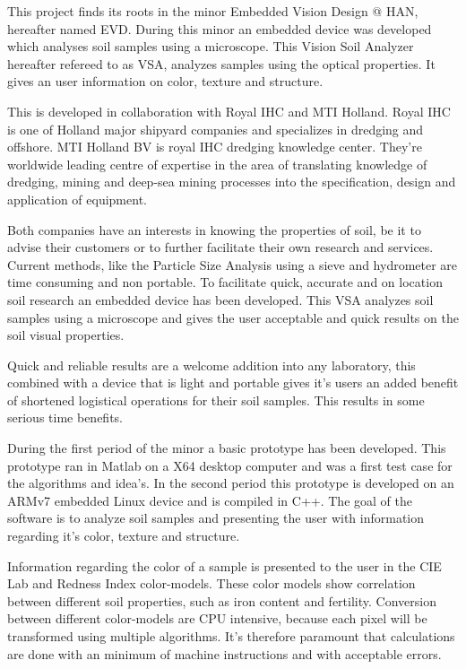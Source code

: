 This project finds its roots in the minor Embedded Vision Design @ HAN, hereafter named EVD. During this minor an embedded device was developed which analyses soil samples using a microscope. This Vision Soil Analyzer hereafter refereed to as VSA, analyzes samples using the optical properties. It gives an user information on color, texture and structure.

This is developed in collaboration with Royal IHC and MTI Holland. Royal IHC is one of Holland major shipyard companies and specializes in dredging and offshore. MTI Holland BV is royal IHC dredging knowledge center. They're worldwide leading centre of expertise in the area of translating knowledge of dredging, mining and deep-sea mining processes into the specification, design and application of equipment.

Both companies have an interests in knowing the properties of soil, be it to advise their customers or to further facilitate their own research and services. Current methods, like the Particle Size Analysis using a sieve and hydrometer are time consuming and non portable. To facilitate quick, accurate and on location soil research an embedded device has been developed. This VSA analyzes soil samples using a microscope and gives the user acceptable and quick results on the soil visual properties.

Quick and reliable results are a welcome addition into any laboratory, this combined with a device that is light and portable gives it's users an added benefit of shortened logistical operations for their soil samples. This results in some serious time benefits.

During the first period of the minor a basic prototype has been developed. This prototype ran in Matlab on a X64 desktop computer and was a first test case for the algorithms and idea's. In the second period this prototype is developed on an ARMv7 embedded Linux device and is compiled in C++. The goal of the software is to analyze soil samples and presenting the user with information regarding it's color, texture and structure.

Information regarding the color of a sample is presented to the user in the CIE Lab and Redness Index color-models. These color models show correlation between different soil properties, such as iron content and fertility. Conversion between different color-models are CPU intensive, because each pixel will be transformed using multiple algorithms. It's therefore paramount that calculations are done with an minimum of machine instructions and with acceptable errors.

